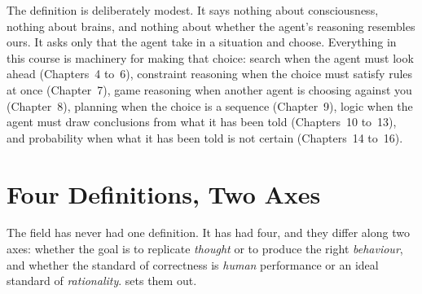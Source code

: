 The definition is deliberately modest. It says nothing about consciousness,
nothing about brains, and nothing about whether the agent's reasoning resembles
ours. It asks only that the agent take in a situation and choose. Everything in
this course is machinery for making that choice: search when the agent must look
ahead (Chapters~4 to~6), constraint reasoning when the choice must satisfy rules
at once (Chapter~7), game reasoning when another agent is choosing against you
(Chapter~8), planning when the choice is a sequence (Chapter~9), logic when the
agent must draw conclusions from what it has been told (Chapters~10 to~13), and
probability when what it has been told is not certain (Chapters~14 to~16).

\section{Four Definitions, Two Axes}

The field has never had one definition. It has had four, and they differ along two
axes: whether the goal is to replicate \emph{thought} or to produce the right
\emph{behaviour}, and whether the standard of correctness is \emph{human}
performance or an ideal standard of \emph{rationality}.  sets them
out.

